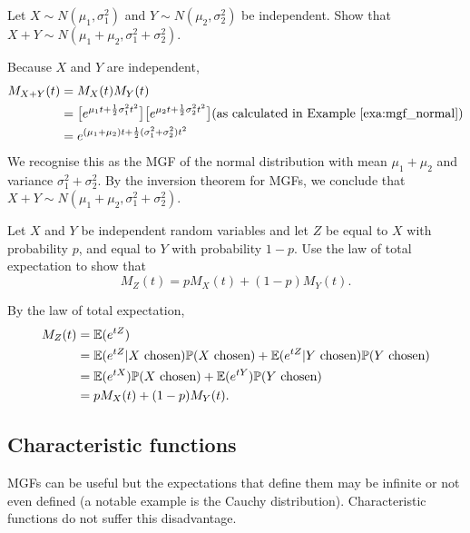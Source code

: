 \begin{exercise}
\begin{questions}
\question %
Let $X\sim N(\mu_1,\sigma_1^2)$ and $Y\sim N(\mu_2,\sigma_2^2)$ be independent. Show that 
$
X+Y \sim N(\mu_1+\mu_2,\sigma_1^2+\sigma_2^2).
$
\begin{answer}
Because $X$ and $Y$ are independent, 
\begin{align*}
M_{X+Y}(t)	
	& = M_X(t)M_Y(t) \\
	& = \big[e^{\mu_1 t + \frac{1}{2}\sigma_1^2t^2}\big]\big[e^{\mu_2 t + \frac{1}{2}\sigma_2^2t^2}\big] \text{(as calculated in Example~\ref{exa:mgf_normal})} \\
	& = e^{(\mu_1+\mu_2) t + \frac{1}{2}(\sigma_1^2+\sigma_2^2)t^2} \\
\end{align*}
We recognise this as the MGF of the normal distribution with mean $\mu_1+\mu_2$ and variance $\sigma_1^2+\sigma_2^2$. By the inversion theorem for MGFs, we conclude that $X+Y \sim N(\mu_1+\mu_2,\sigma_1^2+\sigma_2^2)$.
\end{answer}

\question %
Let $X$ and $Y$ be independent random variables and let $Z$ be equal to $X$ with probability $p$, and equal to $Y$ with probability $1-p$. Use the law of total expectation to show that
\[
M_Z(t) = pM_X(t) + (1-p)M_Y(t).
\]
\begin{answer}
By the law of total expectation,
\begin{align*}
M_Z(t)
	& = \mathbb{E}(e^{tZ}) \\
	& = \mathbb{E}(e^{tZ}|\text{$X$ chosen})\mathbb{P}(\text{$X$ chosen}) + \mathbb{E}(e^{tZ}|\text{$Y$ chosen})\mathbb{P}(\text{$Y$ chosen})  \\
	& = \mathbb{E}(e^{tX})\mathbb{P}(\text{$X$ chosen}) + \mathbb{E}(e^{tY})\mathbb{P}(\text{$Y$ chosen})  \\
	& = pM_X(t) + (1-p)M_Y(t).
\end{align*}
\end{answer}

\end{questions}
\end{exercise}


\subsection{Characteristic functions}

MGFs can be useful but the expectations that define them may be infinite or not even defined (a notable example is the Cauchy distribution). Characteristic functions do not suffer this disadvantage.

